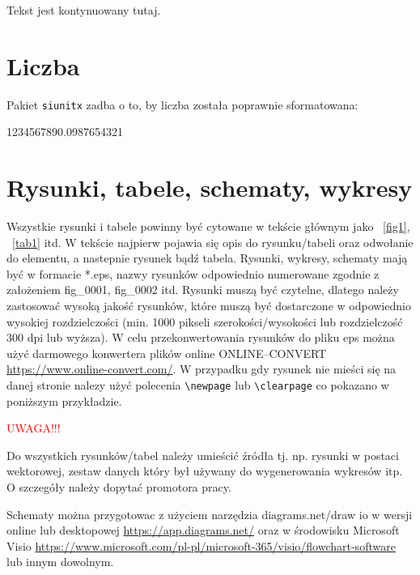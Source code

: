 Tekst jest kontynuowany tutaj.

\section{Liczba}

Pakiet \texttt{siunitx} zadba o to, by liczba została poprawnie sformatowana: \\
\begin{center}
    \num{1234567890.0987654321}
\end{center}

\section{Rysunki, tabele, schematy, wykresy}

Wszystkie rysunki i tabele powinny być cytowane w tekście głównym jako \figurename~\ref{fig1}, \tablename~\ref{tab1} itd.
W tekście najpierw pojawia się opis do rysunku/tabeli oraz odwołanie do elementu, a nastepnie rysunek bądź tabela. Rysunki, wykresy, schematy mają być w formacie *.eps, nazwy rysunków odpowiednio numerowane zgodnie z założeniem fig\_0001, fig\_0002 itd. Rysunki muszą być czytelne, dlatego należy zastosować wysoką jakość rysunków, które muszą być dostarczone w odpowiednio wysokiej rozdzielczości (min. 1000 pikseli szerokości/wysokości lub rozdzielczość 300 dpi lub wyższa). W celu przekonwertowania rysunków do pliku eps można użyć darmowego konwertera plików online ONLINE--CONVERT \url{https://www.online-convert.com/}. W przypadku gdy rysunek nie mieści się na danej stronie nalezy użyć polecenia \texttt{\textbackslash newpage} lub \texttt{\textbackslash clearpage} co pokazano w poniższym przykładzie.

\noindent \textcolor{red}{\Large UWAGA!!!}

Do wszystkich rysunków/tabel należy umieścić źródła tj. np. rysunki w postaci wektorowej, zestaw danych który był używany do wygenerowania wykresów itp. O szczegóły należy dopytać promotora pracy.


Schematy można przygotowac z użyciem narzędzia diagrams.net/draw io w wersji online lub desktopowej \url{https://app.diagrams.net/} oraz w środowisku Microsoft Visio \url{https://www.microsoft.com/pl-pl/microsoft-365/visio/flowchart-software} lub innym dowolnym.
 
